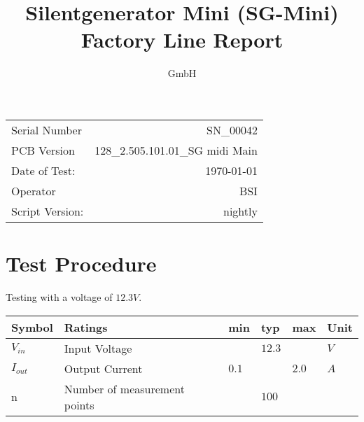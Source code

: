 \documentclass[a4paper,12pt]{article}
\title{Silentgenerator Mini (SG-Mini) \\ Factory Line Report }
\author{
	{\fontfamily{cmss}\selectfont
		GmbH
		\makebox[-2cm][r]{\raisebox{-2ex}{\texttt{[image: graphics/logo.png]}}}
	}
}
\begin{document}
\maketitle

\begin{center}
	\begin{tabular}{l r}
		Serial Number & SN_00042 \\
		PCB Version & 128_2.505.101.01_SG midi Main \\
		Date of Test: & \today \\
		Operator & BSI \\
		Script Version: & nightly \\
	\end{tabular}
\end{center}

\clearpage


\section{Test Procedure}

Testing with a voltage of ${12.3 \si{V}}$.


\begin{center}
	\begin{table}[]
		\begin{tabular}{|l|l|l|l|l|l|}
			\hline
			\textbf{Symbol} & \textbf{Ratings}             & \textbf{min}                & \textbf{typ}              & \textbf{max}                & \textbf{Unit} \\ \hline
			${V_{in}}$      & Input Voltage                &                             & ${12.3}$ &                             & ${\si{V}}$    \\ \hline
			${I_{out}}$     & Output Current               & ${0.1}$ &                           & ${2.0}$ & ${\si{A}}$    \\ \hline
			n               & Number of measurement points &                             & ${100}$       &                             &               \\ \hline
		\end{tabular}
	\end{table}
\end{center}
\end{document}
